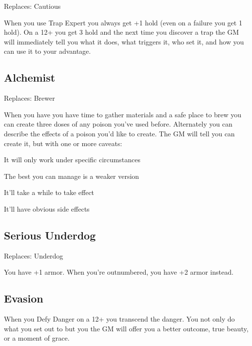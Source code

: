 Replaces: Cautious

 

When you use Trap Expert you always get +1 hold (even on a failure you get 1 hold). On a 12+ you get 3 hold and the next time you discover a trap the GM will immediately tell you what it does, what triggers it, who set it, and how you can use it to your advantage.

 
\subsection{Alchemist}   
 

Replaces: Brewer

 

When you have you have time to gather materials and a safe place to brew you can create three doses of any poison you've used before. Alternately you can describe the effects of a poison you'd like to create. The GM will tell you can create it, but with one or more caveats:

 
\startitemize[1,packed]

\item It will only work under specific circumstances

 
\item The best you can manage is a weaker version

 
\item It'll take a while to take effect

 
\item It'll have obvious side effects


\stopitemize
 
\subsection{Serious Underdog}   
 

Replaces: Underdog

 

You have +1 armor. When you're outnumbered, you have +2 armor instead.

 
\subsection{Evasion}   
 

When you Defy Danger on a 12+ you transcend the danger. You not only do what you set out to but you the GM will offer you a better outcome, true beauty, or a moment of grace.

